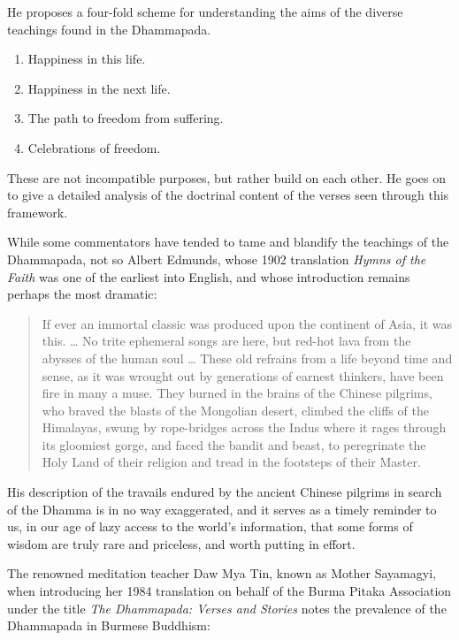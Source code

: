 \documentclass[12pt,openany]{book}%
\begin{document}
He proposes a four-fold scheme for understanding the aims of the diverse teachings found in the Dhammapada.

\begin{enumerate}%
\item Happiness in this life.%
\item Happiness in the next life.%
\item The path to freedom from suffering.%
\item Celebrations of freedom.%
\end{enumerate}

These are not incompatible purposes, but rather build on each other. He goes on to give a detailed analysis of the doctrinal content of the verses seen through this framework.

While some commentators have tended to tame and blandify the teachings of the Dhammapada, not so Albert Edmunds, whose 1902 translation \textit{Hymns of the Faith} was one of the earliest into English, and whose introduction remains perhaps the most dramatic:

\begin{quotation}%
If ever an immortal classic was produced upon the continent of Asia, it was this. … No trite ephemeral songs are here, but red-hot lava from the abysses of the human soul … These old refrains from a life beyond time and sense, as it was wrought out by generations of earnest thinkers, have been fire in many a muse. They burned in the brains of the Chinese pilgrims, who braved the blasts of the Mongolian desert, climbed the cliffs of the Himalayas, swung by rope-bridges across the Indus where it rages through its gloomiest gorge, and faced the bandit and beast, to peregrinate the Holy Land of their religion and tread in the footsteps of their Master.

%
\end{quotation}

His description of the travails endured by the ancient Chinese pilgrims in search of the Dhamma is in no way exaggerated, and it serves as a timely reminder to us, in our age of lazy access to the world’s information, that some forms of wisdom are truly rare and priceless, and worth putting in effort.

The renowned meditation teacher Daw Mya Tin, known as Mother Sayamagyi, when introducing her 1984 translation on behalf of the Burma Pitaka Association under the title \textit{The Dhammapada: Verses and Stories} notes the prevalence of the Dhammapada in Burmese Buddhism:
\end{document}
